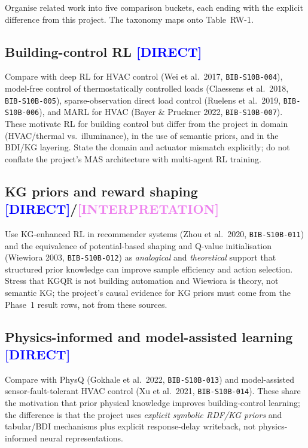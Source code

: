 \documentclass[12pt, a4paper, oneside]{memoir}
\newcommand{\evDirect}{\textcolor{blue}{[DIRECT]}}
\newcommand{\evInterp}{\textcolor{violet}{[INTERPRETATION]}}
\begin{document}
Organise related work into five comparison buckets, each ending with the
explicit difference from this project.  The taxonomy maps onto Table~RW-1.

\subsection{Building-control RL \evDirect}

Compare with deep RL for HVAC control (Wei et al.\ 2017,
\texttt{BIB-S10B-004}), model-free control of thermostatically controlled
loads (Claessens et al.\ 2018, \texttt{BIB-S10B-005}), sparse-observation
direct load control (Ruelens et al.\ 2019, \texttt{BIB-S10B-006}), and MARL
for HVAC (Bayer \& Pruckner 2022, \texttt{BIB-S10B-007}).  These motivate RL
for building control but differ from the project in domain (HVAC/thermal
vs.\ illuminance), in the use of semantic priors, and in the BDI/KG
layering.  State the domain and actuator mismatch explicitly; do not
conflate the project's MAS architecture with multi-agent RL training.

\subsection{KG priors and reward shaping \evDirect/\evInterp}

Use KG-enhanced RL in recommender systems (Zhou et al.\ 2020,
\texttt{BIB-S10B-011}) and the equivalence of potential-based shaping and
Q-value initialisation (Wiewiora 2003, \texttt{BIB-S10B-012}) as
\emph{analogical} and \emph{theoretical} support that structured prior
knowledge can improve sample efficiency and action selection.  Stress that
KGQR is not building automation and Wiewiora is theory, not semantic KG\@;
the project's causal evidence for KG priors must come from the Phase~1
result rows, not from these sources.

\subsection{Physics-informed and model-assisted learning \evDirect}

Compare with PhysQ (Gokhale et al.\ 2022, \texttt{BIB-S10B-013}) and
model-assisted sensor-fault-tolerant HVAC control (Xu et al.\ 2021,
\texttt{BIB-S10B-014}).  These share the motivation that prior physical
knowledge improves building-control learning; the difference is that the
project uses \emph{explicit symbolic RDF/KG priors} and tabular/BDI
mechanisms plus explicit response-delay writeback, not physics-informed
neural representations.
\end{document}
